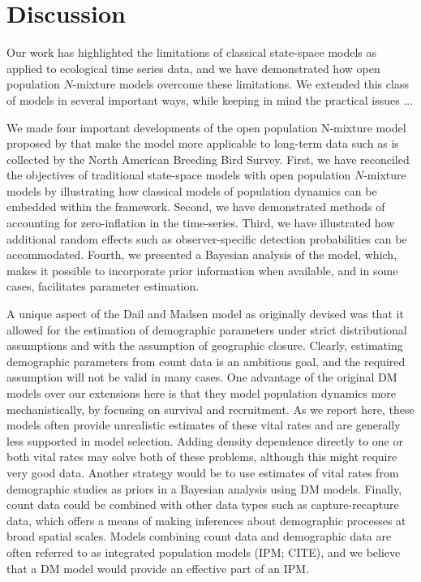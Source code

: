 \documentclass[12pt]{article}
\begin{document}
\section{Discussion}

Our work has highlighted the limitations of classical state-space
models as applied to ecological time series data, and we have
demonstrated how open population $N$-mixture models overcome these
limitations. We extended this class of models in several important
ways, while keeping in mind the practical issues ...

We made four important developments of the open population
N-mixture model proposed by \citep{dail_madsen:2011} that make the
model more applicable to long-term data such as is collected
by the North American Breeding Bird Survey. First, we have
reconciled the objectives of traditional state-space models
with open population $N$-mixture models by illustrating how
classical models of population dynamics can be embedded within
the framework. Second, we have demonstrated methods of
accounting for zero-inflation in the time-series. Third, we
have illustrated how additional random effects such as
observer-specific detection probabilities can be
accommodated. Fourth, we presented a Bayesian analysis of the
model, which, makes it possible to incorporate prior information when
available, and in some cases, facilitates parameter estimation.


A unique aspect of the Dail and Madsen model as originally
devised was that it allowed for the estimation of demographic
parameters under strict distributional assumptions and with the
assumption of geographic closure. Clearly, estimating
demographic parameters from count data is an ambitious goal, and
the required assumption will not be valid in many cases. One
advantage of the original DM models over our extensions here is
that they model population dynamics more mechanistically, by
focusing on survival and recruitment. As we report here, these
models often provide unrealistic estimates of these vital rates
and are generally less supported in model selection. Adding
density dependence directly to one or both vital rates may solve
both of these problems, although this might require very good
data. Another strategy would be to use estimates of vital rates
from demographic studies as priors in a Bayesian analysis using
DM models. Finally, count data could be combined with other data
types such as capture-recapture data, which offers a means of
making inferences about demographic processes at broad spatial
scales. Models combining count data and demographic data are
often referred to as integrated population models (IPM; CITE),
and we believe that a DM model would provide an effective part
of an IPM.
\end{document}
